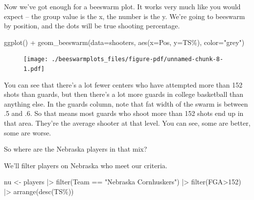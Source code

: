 \documentclass[
  letterpaper,
  DIV=11,
  numbers=noendperiod]{scrreprt}
\newenvironment{Shaded}{\begin{snugshade}}{\end{snugshade}}
\newcommand{\AttributeTok}[1]{\textcolor[rgb]{0.40,0.45,0.13}{#1}}
\newcommand{\DecValTok}[1]{\textcolor[rgb]{0.68,0.00,0.00}{#1}}
\newcommand{\FunctionTok}[1]{\textcolor[rgb]{0.28,0.35,0.67}{#1}}
\newcommand{\NormalTok}[1]{\textcolor[rgb]{0.00,0.23,0.31}{#1}}
\newcommand{\OtherTok}[1]{\textcolor[rgb]{0.00,0.23,0.31}{#1}}
\newcommand{\SpecialCharTok}[1]{\textcolor[rgb]{0.37,0.37,0.37}{#1}}
\newcommand{\StringTok}[1]{\textcolor[rgb]{0.13,0.47,0.30}{#1}}
\begin{document}
Now we've got enough for a beeswarm plot. It works very much like you
would expect -- the group value is the x, the number is the y. We're
going to beeswarm by position, and the dots will be true shooting
percentage.

\begin{Shaded}
\begin{Highlighting}[]
\FunctionTok{ggplot}\NormalTok{() }\SpecialCharTok{+} \FunctionTok{geom\_beeswarm}\NormalTok{(}\AttributeTok{data=}\NormalTok{shooters, }\FunctionTok{aes}\NormalTok{(}\AttributeTok{x=}\NormalTok{Pos, }\AttributeTok{y=}\StringTok{\textasciigrave{}}\AttributeTok{TS\%}\StringTok{\textasciigrave{}}\NormalTok{), }\AttributeTok{color=}\StringTok{"grey"}\NormalTok{)}
\end{Highlighting}
\end{Shaded}

\begin{figure}[H]

{\centering \texttt{[image: ./beeswarmplots\_files/figure-pdf/unnamed-chunk-8-1.pdf]}

}

\end{figure}

You can see that there's a lot fewer centers who have attempted more
than 152 shots than guards, but then there's a lot more guards in
college basketball than anything else. In the guards column, note that
fat width of the swarm is between .5 and .6. So that means most guards
who shoot more than 152 shots end up in that area. They're the average
shooter at that level. You can see, some are better, some are worse.

So where are the Nebraska players in that mix?

We'll filter players on Nebraska who meet our criteria.

\begin{Shaded}
\begin{Highlighting}[]
\NormalTok{nu }\OtherTok{\textless{}{-}}\NormalTok{ players }\SpecialCharTok{|\textgreater{}} 
  \FunctionTok{filter}\NormalTok{(Team }\SpecialCharTok{==} \StringTok{"Nebraska Cornhuskers"}\NormalTok{) }\SpecialCharTok{|\textgreater{}} 
  \FunctionTok{filter}\NormalTok{(FGA}\SpecialCharTok{\textgreater{}}\DecValTok{152}\NormalTok{) }\SpecialCharTok{|\textgreater{}} 
  \FunctionTok{arrange}\NormalTok{(}\FunctionTok{desc}\NormalTok{(}\StringTok{\textasciigrave{}}\AttributeTok{TS\%}\StringTok{\textasciigrave{}}\NormalTok{))}
\end{Highlighting}
\end{Shaded}
\end{document}
